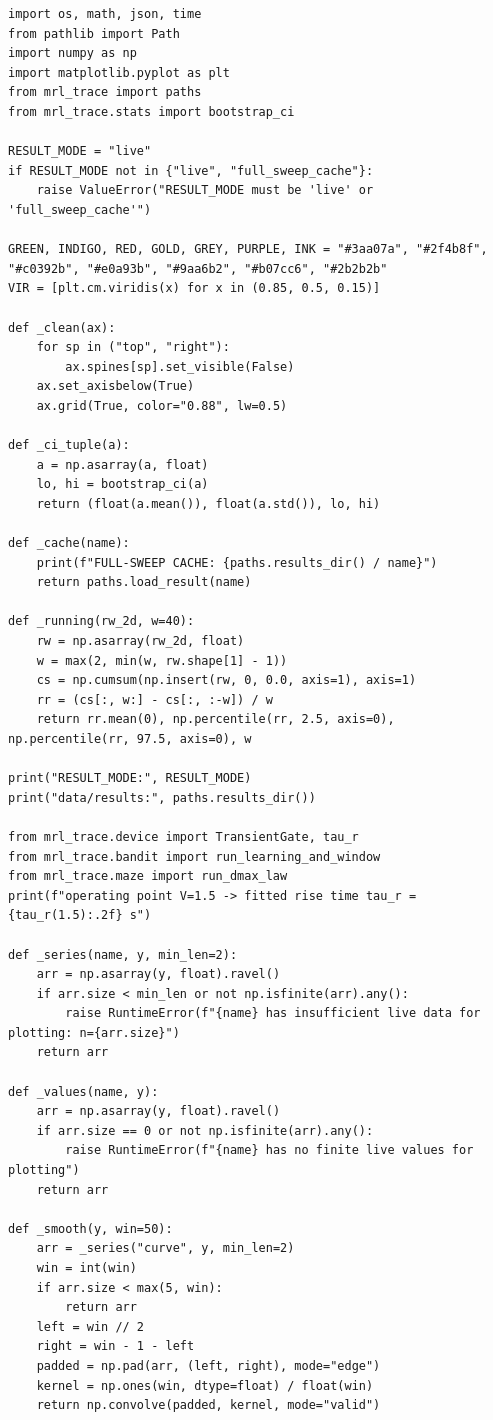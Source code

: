 \begin{lstlisting}[caption={01\_trace\_and\_credit\_window.ipynb code cell 1},label={lst:mrl-nb-01-trace-and-credit-window-1}]
import os, math, json, time
from pathlib import Path
import numpy as np
import matplotlib.pyplot as plt
from mrl_trace import paths
from mrl_trace.stats import bootstrap_ci

RESULT_MODE = "live"
if RESULT_MODE not in {"live", "full_sweep_cache"}:
    raise ValueError("RESULT_MODE must be 'live' or 'full_sweep_cache'")

GREEN, INDIGO, RED, GOLD, GREY, PURPLE, INK = "#3aa07a", "#2f4b8f", "#c0392b", "#e0a93b", "#9aa6b2", "#b07cc6", "#2b2b2b"
VIR = [plt.cm.viridis(x) for x in (0.85, 0.5, 0.15)]

def _clean(ax):
    for sp in ("top", "right"):
        ax.spines[sp].set_visible(False)
    ax.set_axisbelow(True)
    ax.grid(True, color="0.88", lw=0.5)

def _ci_tuple(a):
    a = np.asarray(a, float)
    lo, hi = bootstrap_ci(a)
    return (float(a.mean()), float(a.std()), lo, hi)

def _cache(name):
    print(f"FULL-SWEEP CACHE: {paths.results_dir() / name}")
    return paths.load_result(name)

def _running(rw_2d, w=40):
    rw = np.asarray(rw_2d, float)
    w = max(2, min(w, rw.shape[1] - 1))
    cs = np.cumsum(np.insert(rw, 0, 0.0, axis=1), axis=1)
    rr = (cs[:, w:] - cs[:, :-w]) / w
    return rr.mean(0), np.percentile(rr, 2.5, axis=0), np.percentile(rr, 97.5, axis=0), w

print("RESULT_MODE:", RESULT_MODE)
print("data/results:", paths.results_dir())

from mrl_trace.device import TransientGate, tau_r
from mrl_trace.bandit import run_learning_and_window
from mrl_trace.maze import run_dmax_law
print(f"operating point V=1.5 -> fitted rise time tau_r = {tau_r(1.5):.2f} s")

def _series(name, y, min_len=2):
    arr = np.asarray(y, float).ravel()
    if arr.size < min_len or not np.isfinite(arr).any():
        raise RuntimeError(f"{name} has insufficient live data for plotting: n={arr.size}")
    return arr

def _values(name, y):
    arr = np.asarray(y, float).ravel()
    if arr.size == 0 or not np.isfinite(arr).any():
        raise RuntimeError(f"{name} has no finite live values for plotting")
    return arr

def _smooth(y, win=50):
    arr = _series("curve", y, min_len=2)
    win = int(win)
    if arr.size < max(5, win):
        return arr
    left = win // 2
    right = win - 1 - left
    padded = np.pad(arr, (left, right), mode="edge")
    kernel = np.ones(win, dtype=float) / float(win)
    return np.convolve(padded, kernel, mode="valid")
\end{lstlisting}

